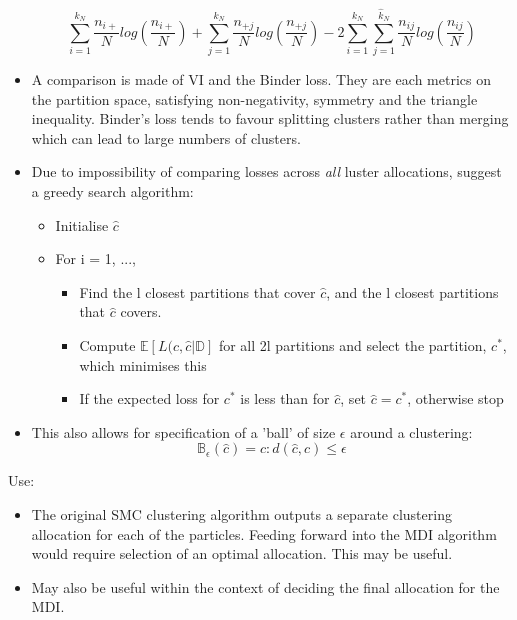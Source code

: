 \documentclass[10pt,a4paper,twoside]{article}
\begin{document}
\begin{itemize}
\begin{equation}
\sum_{i = 1}^{k_N} \frac{n_{i+}}{N}log\left(\frac{n_{i+}}{N}\right) + 
\sum_{j = 1}^{\hat{k}_N} \frac{n_{+j}}{N}log\left(\frac{n_{+j}}{N}\right) -
2 \sum_{i = 1}^{k_N}\sum_{j = 1}^{\hat{k}_N} \frac{n_{ij}}{N}log\left(\frac{n_{ij}}{N}\right)
\end{equation}

\item A comparison is made of VI and the Binder loss. They are each metrics on the partition space, satisfying non-negativity, symmetry and the triangle inequality. Binder's loss tends to favour splitting clusters rather than merging which can lead to large numbers of clusters.

\item Due to impossibility of comparing losses across \textit{all} luster allocations, suggest a greedy search algorithm:
\begin{itemize}
\item Initialise $\hat{c}$
\item For i = 1, ...,
\begin{itemize}
\item Find the l closest partitions that cover $\hat{c}$, and the l closest partitions that $\hat{c}$ covers.
\item Compute $\mathbb{E}\left[L(c, \hat{c} | \mathbb{D}\right]$ for all 2l partitions and select the partition, $c^{*}$, which minimises this
\item If the expected loss for $c^{*}$ is less than for $\hat{c}$, set $\hat{c} = c^{*}$, otherwise stop
\end{itemize}

\end{itemize}

\item This also allows for specification of a 'ball' of size $\epsilon$ around a clustering:
\begin{equation}
\mathbb{B}_{\epsilon}(\hat{c}) = {c: d(\hat{c}, c) \leq \epsilon} 
\end{equation}

\end{itemize}

Use:
\begin{itemize}
\item The original SMC clustering algorithm outputs a separate clustering allocation for each of the particles. Feeding forward into the MDI algorithm would require selection of an optimal allocation. This may be useful.
\item May also be useful within the context of deciding the final allocation for the MDI.
\end{itemize}
\end{document}
